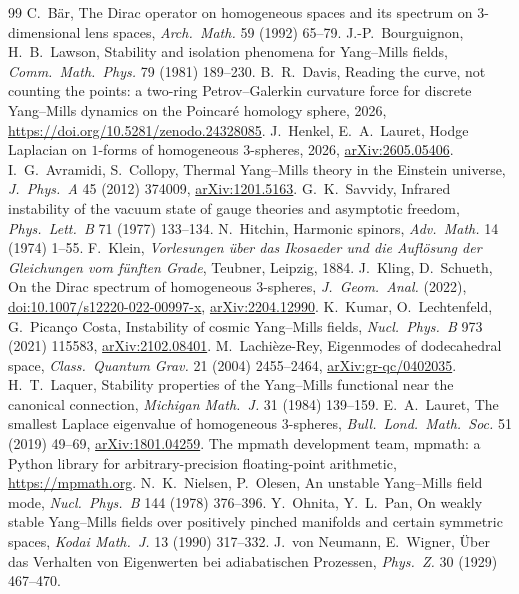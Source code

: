 \documentclass[11pt]{article}
\theoremstyle{definition}
\theoremstyle{remark}
\newif\ifredline
\newcommand{\redins}[1]{\ifredline{\color{blue}#1}\else#1\fi}
\begin{document}
\begin{thebibliography}{99}\small
{} C.~B\"ar, The Dirac operator on homogeneous spaces and its spectrum on $3$-dimensional lens spaces, \emph{Arch.\ Math.} 59 (1992) 65--79.
 J.-P.~Bourguignon, H.~B.~Lawson, Stability and isolation phenomena for Yang--Mills fields, \emph{Comm.\ Math.\ Phys.} 79 (1981) 189--230.
 B.~R.~Davis, Reading the curve, not counting the points: a two-ring Petrov--Galerkin curvature force for discrete Yang--Mills dynamics on the Poincar\'e homology sphere, 2026, \url{https://doi.org/10.5281/zenodo.24328085}.
 J.~Henkel, E.~A.~Lauret, Hodge Laplacian on $1$-forms of homogeneous $3$-spheres, 2026, \href{https://arxiv.org/abs/2605.05406}{arXiv:2605.05406}.
\redins{ I.~G.~Avramidi, S.~Collopy, Thermal Yang--Mills theory in the Einstein universe, \emph{J.\ Phys.\ A} 45 (2012) 374009, \href{https://arxiv.org/abs/1201.5163}{arXiv:1201.5163}.}
\redins{ G.~K.~Savvidy, Infrared instability of the vacuum state of gauge theories and asymptotic freedom, \emph{Phys.\ Lett.\ B} 71 (1977) 133--134.}
 N.~Hitchin, Harmonic spinors, \emph{Adv.\ Math.} 14 (1974) 1--55.
 F.~Klein, \emph{Vorlesungen \"uber das Ikosaeder und die Aufl\"osung der Gleichungen vom f\"unften Grade}, Teubner, Leipzig, 1884.
 J.~Kling, D.~Schueth, On the Dirac spectrum of homogeneous $3$-spheres, \emph{J.\ Geom.\ Anal.} (2022), \href{https://doi.org/10.1007/s12220-022-00997-x}{doi:10.1007/s12220-022-00997-x}, \href{https://arxiv.org/abs/2204.12990}{arXiv:2204.12990}.
 K.~Kumar, O.~Lechtenfeld, G.~Pican\c{c}o Costa, Instability of cosmic Yang--Mills fields, \emph{Nucl.\ Phys.\ B} 973 (2021) 115583, \href{https://arxiv.org/abs/2102.08401}{arXiv:2102.08401}.
 M.~Lachi\`eze-Rey, Eigenmodes of dodecahedral space, \emph{Class.\ Quantum Grav.} 21 (2004) 2455--2464, \href{https://arxiv.org/abs/gr-qc/0402035}{arXiv:gr-qc/0402035}.
 H.~T.~Laquer, Stability properties of the Yang--Mills functional near the canonical connection, \emph{Michigan Math.\ J.} 31 (1984) 139--159.
 E.~A.~Lauret, The smallest Laplace eigenvalue of homogeneous $3$-spheres, \emph{Bull.\ Lond.\ Math.\ Soc.} 51 (2019) 49--69, \href{https://arxiv.org/abs/1801.04259}{arXiv:1801.04259}.
 The mpmath development team, mpmath: a Python library for arbitrary-precision floating-point arithmetic, \url{https://mpmath.org}.
 N.~K.~Nielsen, P.~Olesen, An unstable Yang--Mills field mode, \emph{Nucl.\ Phys.\ B} 144 (1978) 376--396.
 Y.~Ohnita, Y.~L.~Pan, On weakly stable Yang--Mills fields over positively pinched manifolds and certain symmetric spaces, \emph{Kodai Math.\ J.} 13 (1990) 317--332.
 J.~von Neumann, E.~Wigner, \"Uber das Verhalten von Eigenwerten bei adiabatischen Prozessen, \emph{Phys.\ Z.} 30 (1929) 467--470.
\end{thebibliography}
\end{document}
